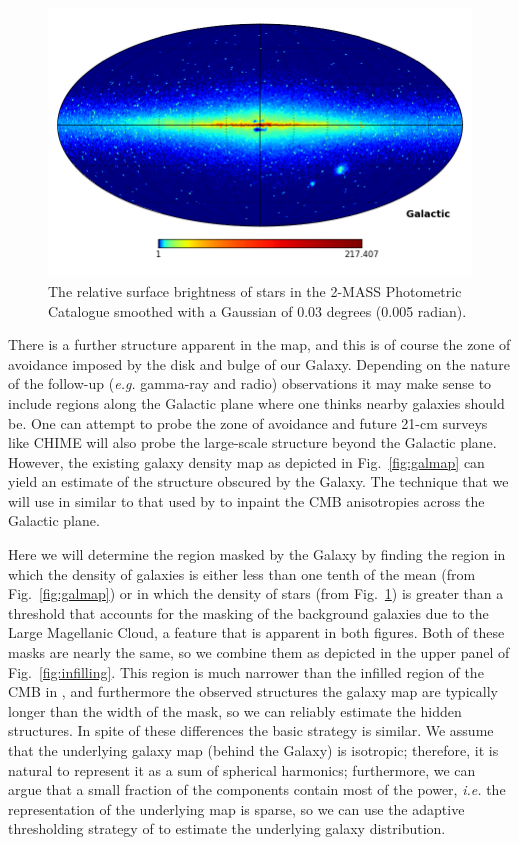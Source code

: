 \documentclass[useAMS,usenatbib]{mn2e}
\begin{document}
\begin{figure}
  \includegraphics[width=\columnwidth]{2mass_density}
  \caption{The relative surface brightness of stars in the 2-MASS
    Photometric Catalogue \citep{2006AJ....131.1163S} smoothed with a Gaussian of 0.03 degrees (0.005 radian).}
  \label{fig:starmap}
\end{figure}
There is a further structure apparent in the map, and this is of
course the zone of avoidance imposed by the disk and bulge of our
Galaxy. Depending on the nature of the follow-up
({\em e.g.} gamma-ray and radio) observations it may make
sense to include regions along the Galactic plane where one thinks
nearby galaxies should be. One can attempt to probe the zone of avoidance
\citep[e.g][]{2000AJ....120..298J} and future 21-cm surveys like CHIME
\citep{2014era..conf10102V} will also probe the large-scale structure
beyond the Galactic plane.   However, the existing galaxy density map
as depicted in Fig.~\ref{fig:galmap} can yield an estimate of the
structure obscured by the Galaxy.  The technique that we will use in
similar to that used by \citet{2008StMet...5..289A} to inpaint the CMB
anisotropies across the Galactic plane.

Here we will determine the region masked by the Galaxy by finding the
region in which the density of galaxies is either less than one tenth
of the mean (from Fig.~\ref{fig:galmap}) or in which the density of
stars (from Fig.~\ref{fig:starmap}) is greater than a threshold that
accounts for the masking of the background galaxies due to the Large
Magellanic Cloud, a feature that is apparent in both figures.  Both of
these masks are nearly the same, so we combine them as depicted in the
upper panel of Fig.~\ref{fig:infilling}.  This region is much narrower
than the infilled region of the CMB in \citet{2008StMet...5..289A},
and furthermore the observed structures the galaxy map are typically
longer than the width of the mask, so we can reliably estimate the
hidden structures.  In spite of these differences the basic strategy
is similar.  We assume that the underlying galaxy map (behind the
Galaxy) is isotropic; therefore, it is natural to represent it as a
sum of spherical harmonics; furthermore, we can argue that a small
fraction of the components contain most of the power, {\em i.e.} the
representation of the underlying map is sparse, so we can use the
adaptive thresholding strategy of \citet{2007ITIP...16.2675B} to
estimate the underlying galaxy distribution.
\end{document}
